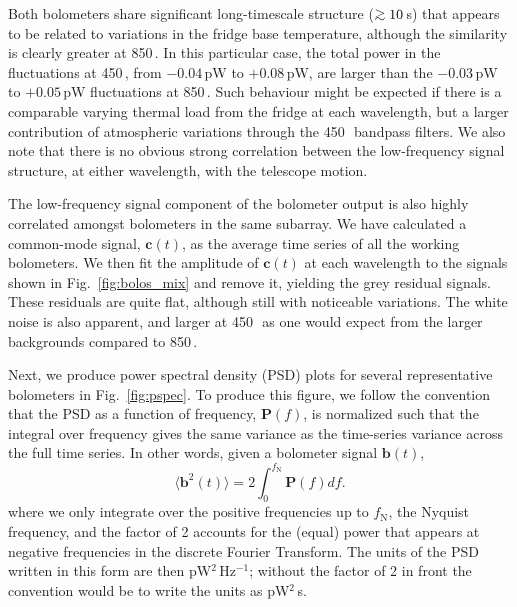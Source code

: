 \documentclass[useAMS,usenatbib,nofootinbib]{mn2e}
\def\gsim{\mathrel{\lower2.5pt\vbox{\lineskip=0pt\baselineskip=0pt
          \hbox{$>$}\hbox{$\sim$}}}}
\begin{document}
Both bolometers share significant long-timescale structure
($\gsim10$\,s) that appears to be related to variations in the fridge
base temperature, although the similarity is clearly greater at
850\,\micron. In this particular case, the total power in the
fluctuations at 450\,\micron, from $-0.04$\,pW to $+0.08$\,pW, are larger
than the $-0.03$\,pW to $+0.05$\,pW fluctuations at 850\,\micron. Such
behaviour might be expected if there is a comparable varying thermal
load from the fridge at each wavelength, but a larger contribution of
atmospheric variations through the 450\,\micron\ bandpass filters. We
also note that there is no obvious strong correlation between the
low-frequency signal structure, at either wavelength, with the
telescope motion.

The low-frequency signal component of the bolometer output is also
highly correlated amongst bolometers in the same subarray. We have
calculated a common-mode signal, $\mathbf{c}(t)$, as the average time
series of all the working bolometers. We then fit the amplitude of
$\mathbf{c}(t)$ at each wavelength to the signals shown in
Fig.~\ref{fig:bolos_mix} and remove it, yielding the grey residual
signals. These residuals are quite flat, although still with
noticeable variations. The white noise is also apparent, and larger at
450\,\micron\ as one would expect from the larger backgrounds compared
to 850\,\micron.

Next, we produce power spectral density (PSD) plots for several
representative bolometers in Fig.~\ref{fig:pspec}. To produce this
figure, we follow the convention that the PSD as a function of
frequency, $\mathbf{P}(f)$, is normalized such that the integral over
frequency gives the same variance as the time-series variance across
the full time series. In other words, given a bolometer signal
$\mathbf{b}(t)$,
%
\begin{equation}
\label{eq:psd}
\langle\mathbf{b}^2(t)\rangle = 2 \int_0^{f_\mathrm{N}} \mathbf{P}(f)
df .
\end{equation}
%
where we only integrate over the positive frequencies up to
$f_\mathrm{N}$, the Nyquist frequency, and the factor of 2 accounts
for the (equal) power that appears at negative frequencies in the
discrete Fourier Transform. The units of the PSD written in this form
are then pW$^2$\,Hz$^{-1}$; without the factor of 2 in front the
convention would be to write the units as pW$^2$\,s.
\end{document}

